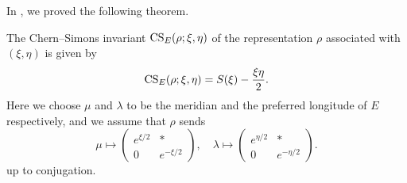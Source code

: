 In \cite{Murakami/Tran:2020}, we proved the following theorem.
\begin{thm}
The Chern--Simons invariant $\operatorname{CS}_{E}(\rho;\xi,\eta)$ of the representation $\rho$ associated with $(\xi,\eta)$ is given by
\begin{equation*}
  \operatorname{CS}_{E}(\rho;\xi,\eta)
  =
  S(\xi)-\frac{\xi\eta}{2}.
\end{equation*}
Here we choose $\mu$ and $\lambda$ to be the meridian and the preferred longitude of $E$ respectively, and we assume that $\rho$ sends
\begin{equation*}
  \mu
  \mapsto
  \begin{pmatrix}
    e^{\xi/2}&\ast \\
    0          &e^{-\xi/2}
  \end{pmatrix},
  \quad
  \lambda
  \mapsto
  \begin{pmatrix}
    e^{\eta/2}&\ast \\
    0         &e^{-\eta/2}
  \end{pmatrix}.
\end{equation*}
up to conjugation.
\end{thm}
